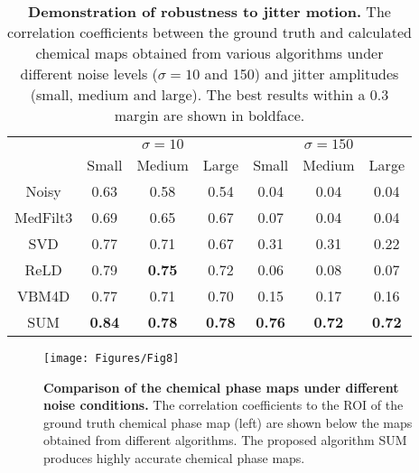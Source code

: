 \documentclass[10pt,twocolumn,letterpaper]{article}
\begin{document}
\begin{table}[!ht]
    \centering
    \footnotesize{
    \begin{tabular}{ccccccc}
        \toprule
        
        \multicolumn{1}{l}{\phantom} &
        \multicolumn{3}{c}{$\sigma = 10$}    &
        \multicolumn{3}{c}{$\sigma = 150$}   \\
        \cmidrule(lr){2-4}
        \cmidrule(lr){5-7}
        &
        \multicolumn{1}{c}{Small} &
        \multicolumn{1}{c}{Medium} &
        \multicolumn{1}{c}{Large} &
        \multicolumn{1}{c}{Small} &
        \multicolumn{1}{c}{Medium} &
        \multicolumn{1}{c}{Large} \\

        \midrule
        Noisy & 0.63 & 0.58 & 0.54 & 0.04 & 0.04 & 0.04    \\
         MedFilt3 & 0.69 & 0.65 & 0.67 & 0.07 & 0.04 & 0.04    \\
         SVD & 0.77 & 0.71& 0.67& 0.31 & 0.31 & 0.22   \\
          ReLD & 0.79 & \textbf{0.75}& 0.72& 0.06 & 0.08 & 0.07   \\
        VBM4D & 0.77 & 0.71& 0.70& 0.15 & 0.17 & 0.16     \\
       
        SUM  & \textbf{0.84} & \textbf{0.78}& \textbf{0.78} & \textbf{0.76}& \textbf{0.72} & \textbf{0.72}   \\
        \bottomrule 
    \end{tabular}
    }
    \vspace{-5pt}
    \caption{\textbf{Demonstration of robustness to jitter motion.} The correlation coefficients between the ground truth and calculated chemical maps obtained from various algorithms under different noise levels ($\sigma=10$ and 150) and jitter amplitudes (small, medium and large). The best results within a 0.3 margin are shown in boldface.
        } 
    \label{tab:jittermotion}
    \vspace{-15pt}
\end{table}
\begin{figure*}
  \centering
   
    \texttt{[image: Figures/Fig8]}
    \vspace{-5pt}
    \caption{\textbf{Comparison of the chemical phase maps under different noise conditions.} The correlation coefficients to the ROI of the ground truth chemical phase map (left) are shown below the maps obtained from different algorithms. The proposed algorithm SUM produces highly accurate chemical phase maps.}
    \label{fig8}
    \vspace{-10pt}
\end{figure*} 
\vspace{-4pt}
\end{document}
